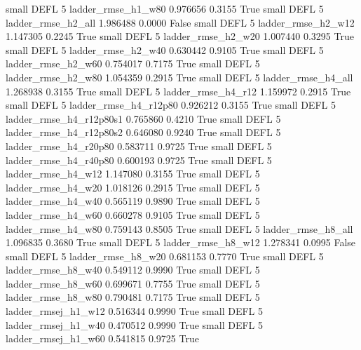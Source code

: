      small     DEFL                 5       ladder_rmse_h1_w80   0.976656      0.3155    True
     small     DEFL                 5       ladder_rmse_h2_all   1.986488      0.0000   False
     small     DEFL                 5       ladder_rmse_h2_w12   1.147305      0.2245    True
     small     DEFL                 5       ladder_rmse_h2_w20   1.007440      0.3295    True
     small     DEFL                 5       ladder_rmse_h2_w40   0.630442      0.9105    True
     small     DEFL                 5       ladder_rmse_h2_w60   0.754017      0.7175    True
     small     DEFL                 5       ladder_rmse_h2_w80   1.054359      0.2915    True
     small     DEFL                 5       ladder_rmse_h4_all   1.268938      0.3155    True
     small     DEFL                 5       ladder_rmse_h4_r12   1.159972      0.2915    True
     small     DEFL                 5    ladder_rmse_h4_r12p80   0.926212      0.3155    True
     small     DEFL                 5  ladder_rmse_h4_r12p80s1   0.765860      0.4210    True
     small     DEFL                 5  ladder_rmse_h4_r12p80s2   0.646080      0.9240    True
     small     DEFL                 5    ladder_rmse_h4_r20p80   0.583711      0.9725    True
     small     DEFL                 5    ladder_rmse_h4_r40p80   0.600193      0.9725    True
     small     DEFL                 5       ladder_rmse_h4_w12   1.147080      0.3155    True
     small     DEFL                 5       ladder_rmse_h4_w20   1.018126      0.2915    True
     small     DEFL                 5       ladder_rmse_h4_w40   0.565119      0.9890    True
     small     DEFL                 5       ladder_rmse_h4_w60   0.660278      0.9105    True
     small     DEFL                 5       ladder_rmse_h4_w80   0.759143      0.8505    True
     small     DEFL                 5       ladder_rmse_h8_all   1.096835      0.3680    True
     small     DEFL                 5       ladder_rmse_h8_w12   1.278341      0.0995   False
     small     DEFL                 5       ladder_rmse_h8_w20   0.681153      0.7770    True
     small     DEFL                 5       ladder_rmse_h8_w40   0.549112      0.9990    True
     small     DEFL                 5       ladder_rmse_h8_w60   0.699671      0.7755    True
     small     DEFL                 5       ladder_rmse_h8_w80   0.790481      0.7175    True
     small     DEFL                 5      ladder_rmsej_h1_w12   0.516344      0.9990    True
     small     DEFL                 5      ladder_rmsej_h1_w40   0.470512      0.9990    True
     small     DEFL                 5      ladder_rmsej_h1_w60   0.541815      0.9725    True
